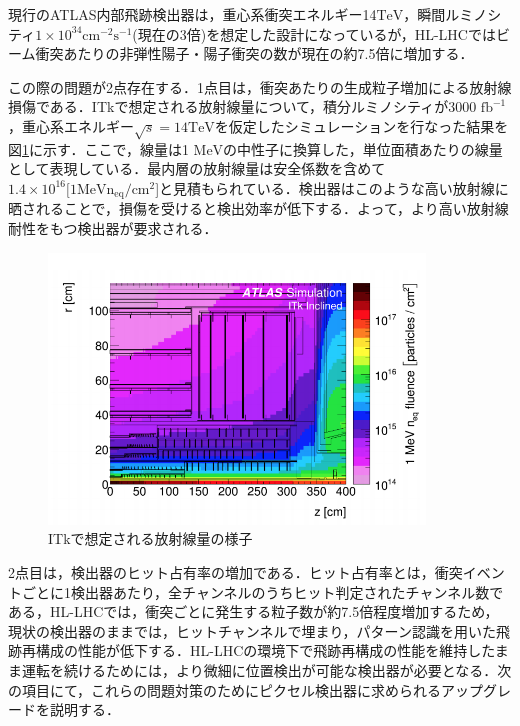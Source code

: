 現行のATLAS内部飛跡検出器は，重心系衝突エネルギー14$\mathrm{TeV}$，瞬間ルミノシティ$1 \times 10^{34} \mathrm{cm^{-2} s^{-1}}$(現在の3倍)を想定した設計になっているが，HL-LHCではビーム衝突あたりの非弾性陽子・陽子衝突の数が現在の約7.5倍に増加する．\par
この際の問題が2点存在する．1点目は，衝突あたりの生成粒子増加による放射線損傷である．ITkで想定される放射線量について，積分ルミノシティが3000 $\mathrm{fb^{-1}}$，重心系エネルギー$\sqrt{s} = 14 \mathrm{TeV}$を仮定したシミュレーションを行なった結果を図\ref{fig:radi}に示す．ここで，線量は1 $\mathrm{MeV}$の中性子に換算した，単位面積あたりの線量として表現している．最内層の放射線量は安全係数を含めて$1.4 \times 10^{16} [\mathrm{1MeV n_{eq}/cm^{2}}$]と見積もられている．検出器はこのような高い放射線に晒されることで，損傷を受けると検出効率が低下する．よって，より高い放射線耐性をもつ検出器が要求される．\par

\begin{figure}[h]
  \centering
  \includegraphics[width=10cm]{./figure/radi.png}
  \caption{ITkで想定される放射線量の様子\cite{Collaboration:2257755}}
  \label{fig:radi}
\end{figure}



2点目は，検出器のヒット占有率の増加である．ヒット占有率とは，衝突イベントごとに1検出器あたり，全チャンネルのうちヒット判定されたチャンネル数である，HL-LHCでは，衝突ごとに発生する粒子数が約7.5倍程度増加するため，現状の検出器のままでは，ヒットチャンネルで埋まり，パターン認識を用いた飛跡再構成の性能が低下する．HL-LHCの環境下で飛跡再構成の性能を維持したまま運転を続けるためには，より微細に位置検出が可能な検出器が必要となる．次の項目にて，これらの問題対策のためにピクセル検出器に求められるアップグレードを説明する．\par

